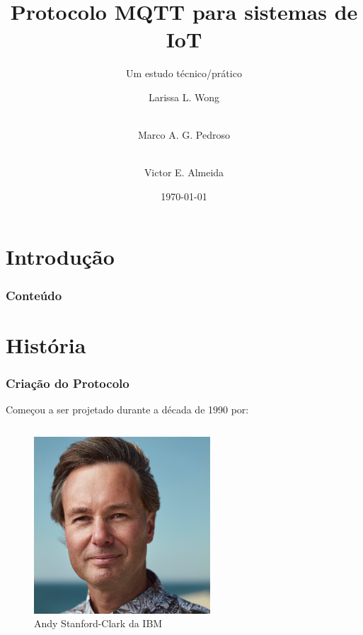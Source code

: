 \documentclass[12pt]{beamer}
\author[Grupo: MQTT]{Larissa L. Wong\and\\Marco A. G. Pedroso\and\\Victor E. Almeida}
\title{Protocolo MQTT para sistemas de IoT}
\subtitle{Um estudo técnico/prático}
\date{\today}
\institute{UNIOESTE}
\begin{document}
\frame{\titlepage}

\section{Introdução}\label{Introdução}

\begin{frame}
\frametitle{Conteúdo}
\tableofcontents
\end{frame}

\section{História}\label{História}
\begin{frame}
    \frametitle{Criação do Protocolo}
    Começou a ser projetado durante a década de 1990 por:
    \begin{columns}[c]
        \begin{column}{.5\textwidth}
            \begin{figure}[!htb]
                \centering
                \includegraphics[width=.75\textwidth]{andy_stanford_clark1}
                \caption{\label{fig:andy}Andy Stanford-Clark da IBM}
            \end{figure}
        \end{column}
        \begin{column}{.5\textwidth}
            \begin{figure}[!htb]
                \centering

\end{figure}
\end{column}
\end{columns}
\end{frame}
\end{document}
